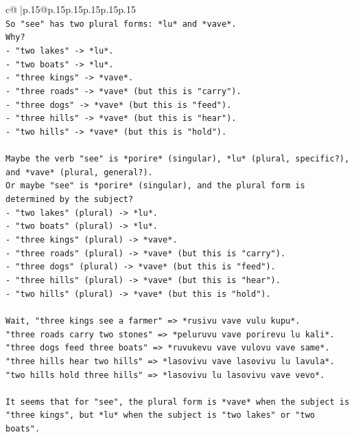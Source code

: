 \documentclass{article}
\begin{document}
{\begin{supertabular}{c@{$\;$}|p{.15\linewidth}@{}p{.15\linewidth}p{.15\linewidth}p{.15\linewidth}p{.15\linewidth}p{.15\linewidth}}
{{{\\ 
\texttt{So "see" has two plural forms: *lu* and *vave*.} \\
\texttt{Why?} \\
\texttt{{-} "two lakes" {-}> *lu*.} \\
\texttt{{-} "two boats" {-}> *lu*.} \\
\texttt{{-} "three kings" {-}> *vave*.} \\
\texttt{{-} "three roads" {-}> *vave* (but this is "carry").} \\
\texttt{{-} "three dogs" {-}> *vave* (but this is "feed").} \\
\texttt{{-} "three hills" {-}> *vave* (but this is "hear").} \\
\texttt{{-} "two hills" {-}> *vave* (but this is "hold").} \\
\\ 
\texttt{Maybe the verb "see" is *porire* (singular), *lu* (plural, specific?), and *vave* (plural, general?).} \\
\texttt{Or maybe "see" is *porire* (singular), and the plural form is determined by the subject?} \\
\texttt{{-} "two lakes" (plural) {-}> *lu*.} \\
\texttt{{-} "two boats" (plural) {-}> *lu*.} \\
\texttt{{-} "three kings" (plural) {-}> *vave*.} \\
\texttt{{-} "three roads" (plural) {-}> *vave* (but this is "carry").} \\
\texttt{{-} "three dogs" (plural) {-}> *vave* (but this is "feed").} \\
\texttt{{-} "three hills" (plural) {-}> *vave* (but this is "hear").} \\
\texttt{{-} "two hills" (plural) {-}> *vave* (but this is "hold").} \\
\\ 
\texttt{Wait, "three kings see a farmer" => *rusivu vave vulu kupu*.} \\
\texttt{"three roads carry two stones" => *peluruvu vave porirevu lu kali*.} \\
\texttt{"three dogs feed three boats" => *ruvukevu vave vulovu vave same*.} \\
\texttt{"three hills hear two hills" => *lasovivu vave lasovivu lu lavula*.} \\
\texttt{"two hills hold three hills" => *lasovivu lu lasovivu vave vevo*.} \\
\\ 
\texttt{It seems that for "see", the plural form is *vave* when the subject is "three kings", but *lu* when the subject is "two lakes" or "two boats".} \\
}}}
\end{supertabular}}
\end{document}
